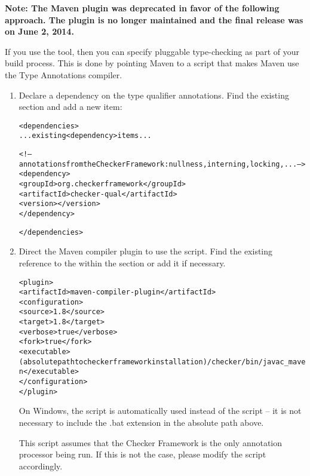 \textbf{Note: The Maven plugin
was deprecated in favor of the following approach.  The plugin is no
longer maintained and the final release was on June 2, 2014.}

If you use the  tool,
then you can specify pluggable type-checking as part of your build
process. This is done by pointing Maven to a script that
makes Maven use the Type Annotations compiler.

\begin{enumerate}

\item Declare a dependency on the type qualifier annotations.  Find the
  existing  section and add a new
   item:

\begin{alltt}
    <dependencies>
        ... existing <dependency> items ...

        <!-- annotations from the Checker Framework: nullness, interning, locking, ... -->
        <dependency>
            <groupId>org.checkerframework</groupId>
            <artifactId>checker-qual</artifactId>
            <version>\ReleaseVersion{}</version>
        </dependency>

    </dependencies>
\end{alltt}

\item Direct the Maven compiler plugin to use the  script. Find
the existing reference to the  within the 
section or add it if necessary.

\begin{alltt}
      <plugin>
        <artifactId>maven-compiler-plugin</artifactId>
        <configuration>
          <source>1.8</source>
          <target>1.8</target>
          <verbose>true</verbose>
          <fork>true</fork>
          <executable>(absolute path to checker framework installation)/checker/bin/javac_maven</executable>
        </configuration>
      </plugin>
\end{alltt}

On Windows, the  script is automatically used instead
of the  script -- it is not necessary to include the .bat
extension in the absolute path above.

This script assumes that the Checker Framework is the only annotation processor being run.
If this is not the case, please modify the  script accordingly.


\end{enumerate}
